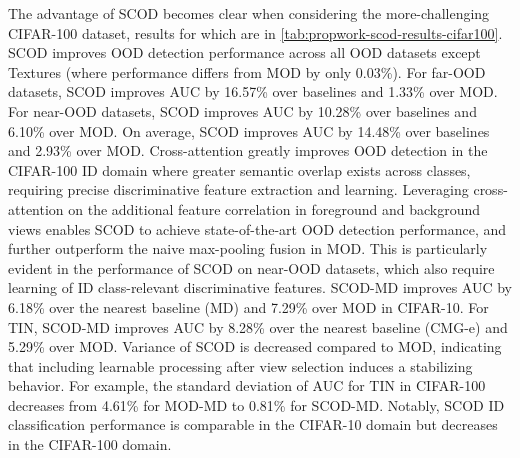 The advantage of SCOD becomes clear when considering the more-challenging CIFAR-100 dataset, results for which are in \ref{tab:propwork-scod-results-cifar100}. SCOD improves OOD detection performance across all OOD datasets except Textures (where performance differs from MOD by only 0.03\%). For far-OOD datasets, SCOD improves AUC by 16.57\% over baselines and 1.33\% over MOD. For near-OOD datasets, SCOD improves AUC by 10.28\% over baselines and 6.10\% over MOD. On average, SCOD improves AUC by 14.48\% over baselines and 2.93\% over MOD. Cross-attention greatly improves OOD detection in the CIFAR-100 ID domain where greater semantic overlap exists across classes, requiring precise discriminative feature extraction and learning. Leveraging cross-attention on the additional feature correlation in foreground and background views enables SCOD to achieve state-of-the-art OOD detection performance, and further outperform the naive max-pooling fusion in MOD. This is particularly evident in the performance of SCOD on near-OOD datasets, which also require learning of ID class-relevant discriminative features. SCOD-MD improves AUC by 6.18\% over the nearest baseline (MD) and 7.29\% over MOD in CIFAR-10. For TIN, SCOD-MD improves AUC by 8.28\% over the nearest baseline (CMG-e) and 5.29\% over MOD. Variance of SCOD is decreased compared to MOD, indicating that including learnable processing after view selection induces a stabilizing behavior. For example, the standard deviation of AUC for TIN in CIFAR-100 decreases from 4.61\% for MOD-MD to 0.81\% for SCOD-MD. Notably, SCOD ID classification performance is comparable in the CIFAR-10 domain but decreases in the CIFAR-100 domain.

